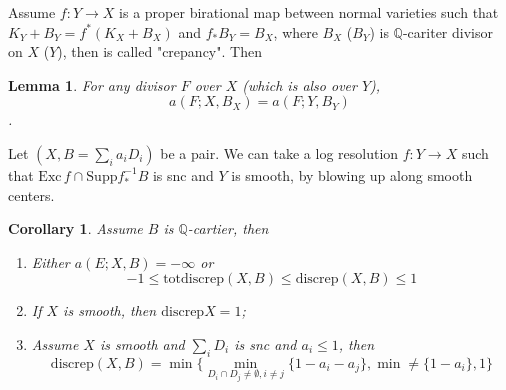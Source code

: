 \documentclass{article}
\newtheorem{lem}[defn]{Lemma}
\newtheorem{cor}[defn]{Corollary}
\begin{document}
Assume $ f:Y\to X $ is a proper birational map between normal varieties such that $ K_Y+B_Y=f^*(K_X+B_X) $ and $ f_*B_Y=B_X $, where $ B_X $ ($ B_Y $) is $ \mathbb{Q} $-cariter divisor on $ X $ ($ Y $), then is called "crepancy". Then
\begin{lem}
  For any divisor $ F $ over $ X $ (which is also over $ Y $), 
  $$ a(F;X,B_X)=a(F;Y,B_Y) $$. 
\end{lem}

Let $ (X,B=\sum_ia_iD_i) $ be  a pair. We can take a log resolution $ f:Y\to X $ such that $ \mathrm{Exc}\,f\cap \mathrm{Supp}f^{-1}_*B $ is snc and $ Y $ is smooth, by blowing up along smooth centers.

\begin{cor}
  Assume $ B $ is $ \mathbb{Q} $-cartier, then
  \begin{enumerate}[(1)]
    \item Either $ a(E;X,B)=-\infty $ or 
    \[ -1\leqslant \mathrm{totdiscrep}(X,B)\leqslant \mathrm{discrep }(X,B)\leqslant 1 \]
    \item If $ X $ is smooth, then $ \mathrm{discrep}X=1 $;
    \item Assume $ X $ is smooth and $ \sum_i D_i $ is snc and $ a_i\leqslant 1 $, then
    $$ \mathrm{discrep}(X,B)=\min \{  \min_{D_i\cap D_j\neq \emptyset,i\neq j}\{1-a_i-a_j\}, \min\neq \{1-a_i\},1\} $$ 
  \end{enumerate}
\end{cor} 
\end{document}
